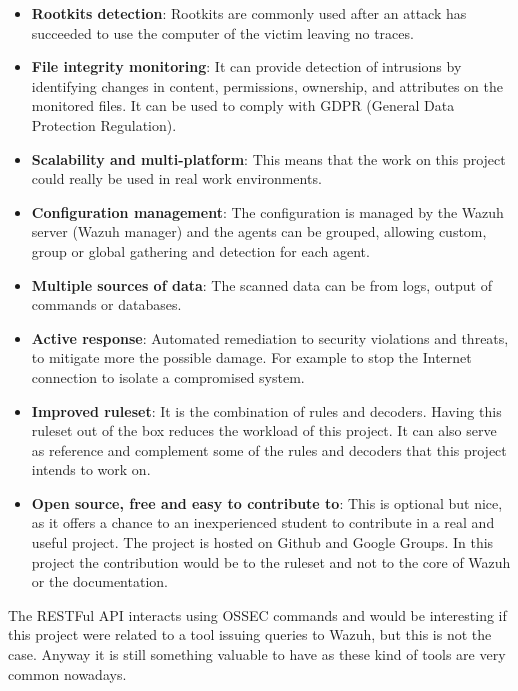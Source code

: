\begin{itemize}
	\item \textbf{Rootkits detection}: Rootkits are commonly used after an attack has succeeded to use the computer of the victim leaving no traces.
	\item \textbf{File integrity monitoring}: It can provide detection of intrusions by identifying changes in content, permissions, ownership, and attributes on the monitored files. It can be used to comply with GDPR (General Data Protection Regulation).
	\item \textbf{Scalability and multi-platform}: This means that the work on this project could really be used in real work environments.
	\item \textbf{Configuration management}: The configuration is managed by the Wazuh server (Wazuh manager) and the agents can be grouped, allowing custom, group or global gathering and detection for each agent.
	\item \textbf{Multiple sources of data}: The scanned data can be from logs, output of commands or databases.
	\item \textbf{Active response}: Automated remediation to security violations and threats, to mitigate more the possible damage. For example to stop the Internet connection to isolate a compromised system.
	\item \textbf{Improved ruleset}: It is the combination of rules and decoders. Having this ruleset out of the box reduces the workload of this project. It can also serve as reference and complement some of the rules and decoders that this project intends to work on.
	\item \textbf{Open source, free and easy to contribute to}: This is optional but nice, as it offers a chance to an inexperienced student to contribute in a real and useful project. The project is hosted on Github and Google Groups. In this project the contribution would be to the ruleset\cite{wazuh_ruleset} and not to the core of Wazuh\cite{wazuh} or the documentation\cite{wazuh_documentation2}.
\end{itemize}
\linej
The RESTFul API interacts using OSSEC commands and would be interesting if this project were related to a tool issuing queries to Wazuh, but this is not the case. Anyway it is still something valuable to have as these kind of tools are very common nowadays.

